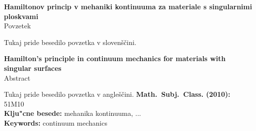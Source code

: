 \begin{center}
{\bf Hamiltonov princip v mehaniki kontinuuma za materiale s singularnimi ploskvami}\\[3mm]
{\sc Povzetek}
\end{center}
\textcolor[rgb]{1,0,0}{Tukaj pride besedilo povzetka v slovenščini.}
\vfill
\begin{center}
{\bf Hamilton's principle in continuum mechanics for materials with singular surfaces}\\[3mm]
{\sc Abstract}
\end{center}
\textcolor[rgb]{1,0,0}{Tukaj pride besedilo povzetka v angleščini.}
\vfill\noindent
{\bf Math.~Subj.~Class. (2010):} \textcolor[rgb]{1,0,0}{51M10}  \\[1mm]  
{\bf Klju"cne besede:} \textcolor[rgb]{1,0,0}{mehanika kontinuuma, ...} \\[1mm]  
{\bf Keywords:} \textcolor[rgb]{1,0,0}{continuum mechanics}
